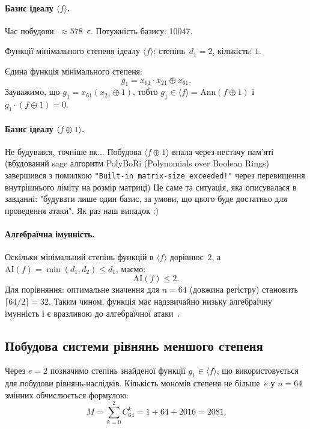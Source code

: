 \paragraph{Базис ідеалу $\langle f \rangle$.}
Час побудови: $\approx 578$~с. Потужність базису: 10047.

Функції мінімального степеня ідеалу $\langle f \rangle$: степінь~$d_1 = 2$, кількість: $1$.

Єдина функція мінімального степеня:
\begin{equation*}
    g_1 = x_{61} \cdot x_{21} \oplus x_{61}.
\end{equation*}
Зауважимо, що $g_1 = x_{61}(x_{21} \oplus 1)$, тобто $g_1 \in \langle f \rangle = \mathrm{Ann}(f \oplus 1)$
і $g_1 \cdot (f \oplus 1) = 0$.

\paragraph{Базис ідеалу $\langle f \oplus 1 \rangle$.}

Не будувався, точніше як... Побудова $\langle f \oplus 1 \rangle$ впала через нестачу пам'яті (вбудований sage алгоритм 
PolyBoRi (Polynomials over Boolean Rings) завершився з помилкою \texttt{"Built-in matrix-size exceeded!"} через 
перевищення внутрішнього ліміту на розмір матриці) Це саме та ситуація, яка описувалася в завданні: "будувати лише 
один базис, за умови, що цього буде достатньо для проведення атаки". Як раз наш випадок :)

\paragraph{Алгебраїчна імунність.}
Оскільки мінімальний степінь функцій в $\langle f \rangle$ дорівнює~$2$, а $\mathrm{AI}(f) = \min(d_1, d_2) \leq d_1$, 
маємо:
\begin{equation*}
    \mathrm{AI}(f) \leq 2.
\end{equation*}
Для порівняння: оптимальне значення для $n = 64$ (довжина регістру) становить $\lceil 64/2 \rceil = 32$. Таким 
чином, функція має надзвичайно низьку алгебраїчну імунність і є вразливою до алгебраїчної атаки~\cite{courtois2003}.

\subsection{Побудова системи рівнянь меншого степеня}

Через $e = 2$ позначимо степінь знайденої функції $g_1 \in \langle f \rangle$, що використовується для 
побудови рівнянь-наслідків. Кількість мономів степеня не більше~$e$ у $n = 64$ змінних обчислюється формулою:
\begin{equation*}
    M = \sum_{k=0}^{2} C_{64}^{k} = 1 + 64 + 2016 = 2081.
\end{equation*}

